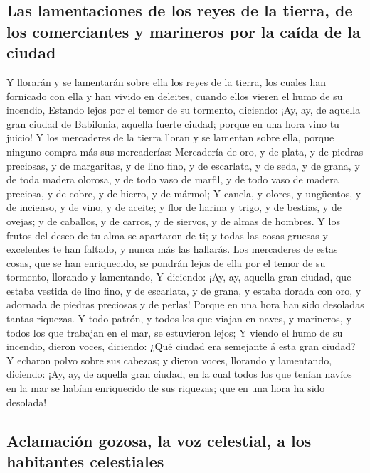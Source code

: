 \hypertarget{las-lamentaciones-de-los-reyes-de-la-tierra-de-los-comerciantes-y-marineros-por-la-cauxedda-de-la-ciudad}{%
\subsection{Las lamentaciones de los reyes de la tierra, de los
comerciantes y marineros por la caída de la
ciudad}\label{las-lamentaciones-de-los-reyes-de-la-tierra-de-los-comerciantes-y-marineros-por-la-cauxedda-de-la-ciudad}}

 Y llorarán y se lamentarán sobre ella los reyes de la
tierra, los cuales han fornicado con ella y han vivido en deleites,
cuando ellos vieren el humo de su incendio,  Estando lejos
por el temor de su tormento, diciendo: ¡Ay, ay, de aquella gran ciudad
de Babilonia, aquella fuerte ciudad; porque en una hora vino tu juicio!
 Y los mercaderes de la tierra lloran y se lamentan sobre
ella, porque ninguno compra más sus mercaderías: 
Mercadería de oro, y de plata, y de piedras preciosas, y de margaritas,
y de lino fino, y de escarlata, y de seda, y de grana, y de toda madera
olorosa, y de todo vaso de marfil, y de todo vaso de madera preciosa, y
de cobre, y de hierro, y de mármol;  Y canela, y olores, y
ungüentos, y de incienso, y de vino, y de aceite; y flor de harina y
trigo, y de bestias, y de ovejas; y de caballos, y de carros, y de
siervos, y de almas de hombres.  Y los frutos del deseo de
tu alma se apartaron de ti; y todas las cosas gruesas y excelentes te
han faltado, y nunca más las hallarás.  Los mercaderes de
estas cosas, que se han enriquecido, se pondrán lejos de ella por el
temor de su tormento, llorando y lamentando,  Y diciendo:
¡Ay, ay, aquella gran ciudad, que estaba vestida de lino fino, y de
escarlata, y de grana, y estaba dorada con oro, y adornada de piedras
preciosas y de perlas!  Porque en una hora han sido
desoladas tantas riquezas. Y todo patrón, y todos los que viajan en
naves, y marineros, y todos los que trabajan en el mar, se estuvieron
lejos;  Y viendo el humo de su incendio, dieron voces,
diciendo: ¿Qué ciudad era semejante á esta gran ciudad?  Y
echaron polvo sobre sus cabezas; y dieron voces, llorando y lamentando,
diciendo: ¡Ay, ay, de aquella gran ciudad, en la cual todos los que
tenían navíos en la mar se habían enriquecido de sus riquezas; que en
una hora ha sido desolada!

\hypertarget{aclamaciuxf3n-gozosa-la-voz-celestial-a-los-habitantes-celestiales}{%
\subsection{Aclamación gozosa, la voz celestial, a los habitantes
celestiales}\label{aclamaciuxf3n-gozosa-la-voz-celestial-a-los-habitantes-celestiales}}

